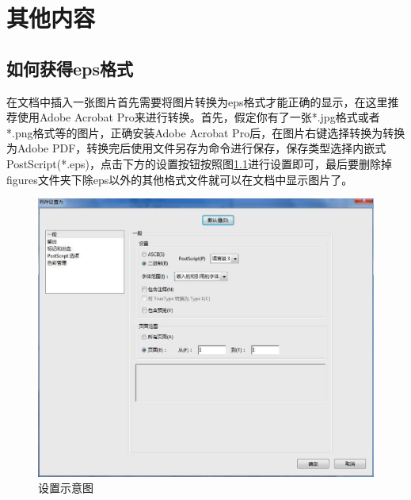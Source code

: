 \chapter{其他内容}
\label{chap:others}

\section{如何获得eps格式}
在文档中插入一张图片首先需要将图片转换为eps格式才能正确的显示，在这里推荐使用Adobe Acrobat Pro来进行转换。首先，假定你有了一张*.jpg格式或者*.png格式等的图片，正确安装Adobe Acrobat Pro后，在图片右键选择转换为转换为Adobe PDF，转换完后使用文件另存为命令进行保存，保存类型选择内嵌式PostScript(*.eps)，点击下方的设置按钮按照图\ref{fig:fig2}进行设置即可，最后要删除掉figures文件夹下除eps以外的其他格式文件就可以在文档中显示图片了。
\begin{figure}[htbp]
\centering
\includegraphics[width=\textwidth]{figures/piccvt}
\caption{设置示意图}\label{fig:fig2}
\vspace{\baselineskip}
\end{figure}
